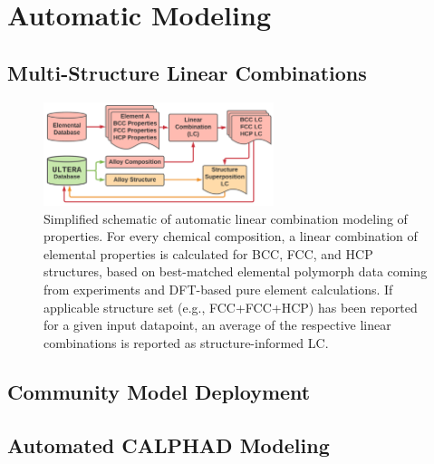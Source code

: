 \section{Automatic Modeling} \label{ultera:sec:automodel}

\subsection{Multi-Structure Linear Combinations} \label{ultera:ssec:autolc}

\cite{Chong2021CorrelationAlloys}

\begin{figure}[H]
    \centering
    \includegraphics[width=0.6\textwidth]{ultera/ULTERA_ElementalDatabase_LC_V1.png}
    \caption{Simplified schematic of automatic linear combination modeling of properties. For every chemical composition, a linear combination of elemental properties is calculated for BCC, FCC, and HCP structures, based on best-matched elemental polymorph data coming from experiments and DFT-based pure element calculations. If applicable structure set (e.g., FCC+FCC+HCP) has been reported for a given input datapoint, an average of the respective linear combinations is reported as structure-informed LC.}
    \label{ultera:fig:autolc}
\end{figure}




\subsection{Community Model Deployment} \label{ultera:ssec:communitymodels}

\todo




\subsection{Automated CALPHAD Modeling} \label{ultera:ssec:autocalphad}

\todo






